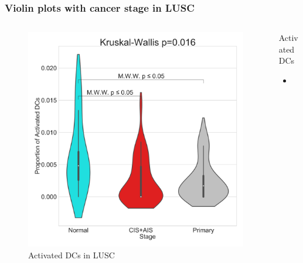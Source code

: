 \documentclass{beamer}
\begin{document}
                \begin{frame}[allowframebreaks]
                    \frametitle{Violin plots with cancer stage in LUSC}

                    \begin{columns}
                        \begin{column}{0.4 \textwidth}
                            \begin{figure}
                                \includegraphics[width=\linewidth]{figures/BisqueRNA/violin/STAR.TPM.GSE131907.SQC/ActivatedDCs.pdf}
                                \caption{Activated DCs in LUSC}
                            \end{figure}
                        \end{column}
                        \begin{column}{0.55 \textwidth}
                            \begin{block}{Activated DCs}
                                \begin{itemize}
                                    \item
                                \end{itemize}
                            \end{block}
                        \end{column}
                    \end{columns}
                \end{frame}
\end{document}
